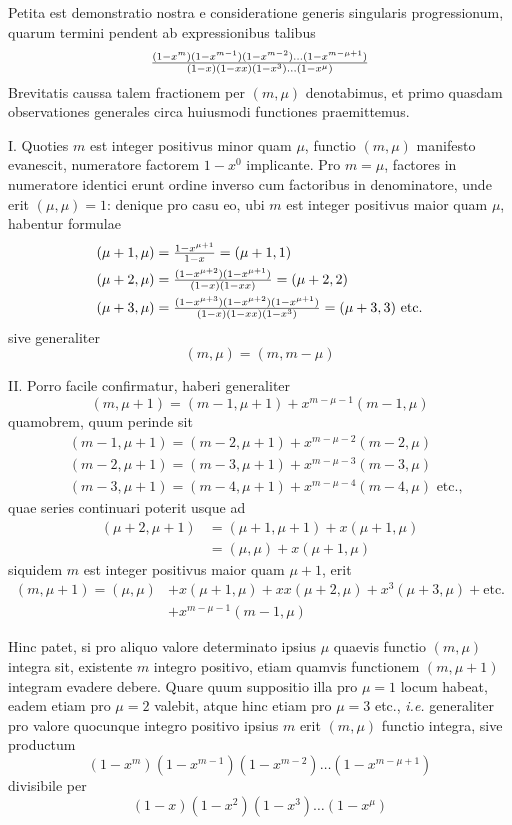 \documentclass[twoside,12pt, showframe]{memoir}
\let\oldfrac\frac
\def\frac#1#2{\mathchoice{\tfrac{#1}{#2}}{\oldfrac{#1}{#2}}{\genfrac{}{}{}{2}{#1}{#2\mathstrut}}{\genfrac{}{}{}{3}{#1}{#2\mathstrut}}}
\begin{document}
Petita est demonstratio nostra e consideratione generis singularis progressionum, quarum termini pendent ab expressionibus talibus
\[\frac{(1-x^{m})(1-x^{m-1})(1-x^{m-2}) \ldots(1-x^{m-\mu+1})}{(1-x)(1-x x)(1-x^{3}) \ldots (1-x^{\mu})}\]
Brevitatis caussa talem fractionem per \((m, \mu)\) denotabimus, et primo quasdam observationes generales circa huiusmodi functiones praemittemus.

I. Quoties \(m\) est integer positivus minor quam \(\mu\), functio \((m, \mu)\) manifesto evanescit, numeratore factorem \(1-x^{0}\) implicante. Pro \(m=\mu\), factores in numeratore identici erunt ordine inverso cum factoribus in denominatore, unde erit \((\mu, \mu)=1\): denique pro casu eo, ubi \(m\) est integer positivus maior quam \(\mu\), habentur formulae
\[\begin{aligned}
& (\mu+1, \mu)=\frac{1-x^{\mu+1}}{1-x}=(\mu+1,1) \\
& (\mu+2, \mu)=\frac{(1-x^{\mu+2})(1-x^{\mu+1})}{(1-x)(1-x x)}=(\mu+2,2) \\
& (\mu+3, \mu)=\frac{(1-x^{\mu+3})(1-x^{\mu+2})(1-x^{\mu+1})}{(1-x)(1-xx)(1-x^{3})}=(\mu+3,3) \text{ etc.}
\end{aligned}\]\clearpage\noindent%
sive generaliter
\[(m, \mu)=(m, m-\mu)\]

II. Porro facile confirmatur, haberi generaliter
\[(m, \mu+1)=(m-1, \mu+1)+x^{m-\mu-1}(m-1, \mu)\]
quamobrem, quum perinde sit
\[\begin{aligned}
& (m-1, \mu+1)=(m-2, \mu+1)+x^{m-\mu-2}(m-2, \mu) \\
& (m-2, \mu+1)=(m-3, \mu+1)+x^{m-\mu-3}(m-3, \mu) \\
& (m-3, \mu+1)=(m-4, \mu+1)+x^{m-\mu-4}(m-4, \mu) \text{ etc.,}
\end{aligned}\]
quae series continuari poterit usque ad
\[\begin{aligned}
(\mu+2, \mu+1) & =(\mu+1, \mu+1)+x(\mu+1, \mu) \\
& =(\mu, \mu)+x(\mu+1, \mu)
\end{aligned}\]
siquidem \(m\) est integer positivus maior quam \(\mu+1\), erit
\[\begin{aligned}
(m , \mu+1)=(\mu, \mu) & +x(\mu+1, \mu)+x x(\mu+2, \mu)+x^{3}(\mu+3, \mu)+\text{etc.} \\
& +x^{m-\mu-1}(m-1, \mu)
\end{aligned}\]

Hinc patet, si pro aliquo valore determinato ipsius \(\mu\) quaevis functio \((m, \mu)\) integra sit, existente \(m\) integro positivo, etiam quamvis functionem \((m, \mu+1)\) integram evadere debere. Quare quum suppositio illa pro \(\mu=1\) locum habeat, eadem etiam pro \(\mu=2\) valebit, atque hinc etiam pro \(\mu=3\) etc., \textit{i.e.} generaliter pro valore quocunque integro positivo ipsius \(m\) erit \((m, \mu)\) functio integra, sive productum
\[(1-x^{m})(1-x^{m-1})(1-x^{m-2}) \ldots(1-x^{m-\mu+1})\]
divisibile per
\[(1-x)(1-x^{2})(1-x^{3}) \ldots(1-x^{\mu})\]
\end{document}
